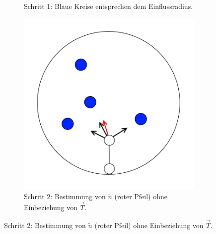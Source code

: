 \begin{figure} [hbtp]
\begin{subfigure}[t]{.31\textwidth}
		\caption{Schritt 1: Blaue Kreise entsprechen dem Einflussradius.}
		\label{subfig:SCA_Basic2}
	\end{subfigure}
	\hspace{.01\textwidth}
	\begin{subfigure}[t]{.31\textwidth}
		\centering
		\includegraphics[width=\linewidth]{images/SCA_Basic3.png}
		\caption{Schritt 2: Bestimmung von $\tilde{n}$ (roter Pfeil) ohne Einbeziehung von $\overrightarrow{T}$.}
		\label{subfig:SCA_Basic3}
	\end{subfigure}


\end{figure}
